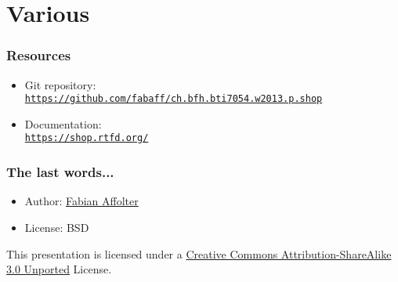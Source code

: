 \section{Various}
%
\begin{frame}
\frametitle{Resources}
%
\begin{itemize}
  \item Git repository: \\ {\scriptsize\texttt{\href{https://github.com/fabaff/ch.bfh.bti7054.w2013.p.shop}{https://github.com/fabaff/ch.bfh.bti7054.w2013.p.shop}}}
  \item Documentation: \\ {\scriptsize\texttt{\href{https://shop.rtfd.org/}{https://shop.rtfd.org/}}}
\end{itemize}
\end{frame}
%
\begin{frame}
\frametitle{The last words...}
%
\begin{itemize}
  \item Author: \href{mailto:affof1@bfh.ch}{Fabian Affolter}
  \item License: BSD
\end{itemize}
%
\vspace{2cm}
\begin{center}
{\footnotesize This presentation is licensed under a \href{http://creativecommons.org/licenses/by-sa/3.0/deed.en_US}{Creative Commons Attribution-ShareAlike 3.0 Unported} License.}
\end{center}
%
\end{frame}
